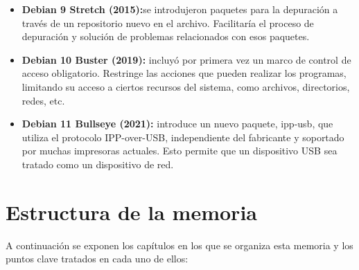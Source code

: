 \documentclass[a4paper, 12pt]{book}
\begin{document}
\begin{itemize}
	\item \textbf {Debian 9 Stretch (2015):}se introdujeron paquetes para la depuración a través de un repositorio nuevo en el archivo. Facilitaría el proceso de depuración y solución de problemas relacionados con esos paquetes.
	\item \textbf {Debian 10 Buster (2019):} incluyó por primera vez un marco de control de acceso obligatorio. Restringe las acciones que pueden realizar los programas, limitando su acceso a ciertos recursos del sistema, como archivos, directorios, redes, etc.
	\item \textbf {Debian 11 Bullseye (2021):} introduce un nuevo paquete, ipp-usb, que utiliza el protocolo IPP-over-USB, independiente del fabricante y soportado por muchas impresoras actuales. Esto permite que un dispositivo USB sea tratado como un dispositivo de red.
	
		
\end{itemize}
	


\section{Estructura de la memoria}
\label{sec:estructura}

A continuación se exponen los capítulos en los que se organiza esta memoria y los puntos clave tratados en cada uno de ellos:
\end{document}
